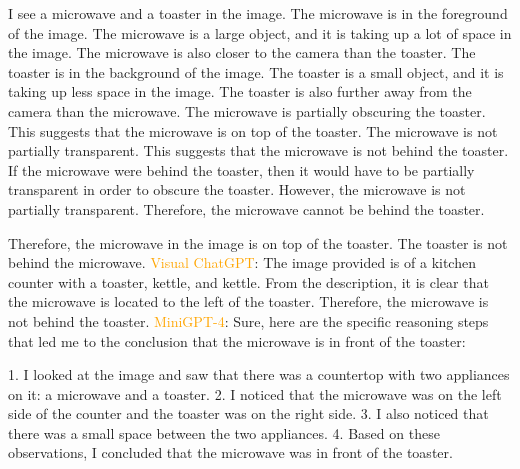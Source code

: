 \begin{enumerate}
    I see a microwave and a toaster in the image.
    The microwave is in the foreground of the image. The microwave is a large object, and it is taking up a lot of space in the image. The microwave is also closer to the camera than the toaster.
    The toaster is in the background of the image. The toaster is a small object, and it is taking up less space in the image. The toaster is also further away from the camera than the microwave.
    The microwave is partially obscuring the toaster. This suggests that the microwave is on top of the toaster.
    The microwave is not partially transparent. This suggests that the microwave is not behind the toaster.
    If the microwave were behind the toaster, then it would have to be partially transparent in order to obscure the toaster. However, the microwave is not partially transparent. Therefore, the microwave cannot be behind the toaster.

    Therefore, the microwave in the image is on top of the toaster. The toaster is not behind the microwave.
    \subitem \textcolor{orange}{Visual ChatGPT}: 
    The image provided is of a kitchen counter with a toaster, kettle, and kettle. From the description, it is clear that the microwave is located to the left of the toaster. Therefore, the microwave is not behind the toaster.
    \subitem \textcolor{orange}{MiniGPT-4}: Sure, here are the specific reasoning steps that led me to the conclusion that the microwave is in front of the toaster:

    1. I looked at the image and saw that there was a countertop with two appliances on it: a microwave and a toaster.
    2. I noticed that the microwave was on the left side of the counter and the toaster was on the right side.
    3. I also noticed that there was a small space between the two appliances.
    4. Based on these observations, I concluded that the microwave was in front of the toaster.
\end{enumerate}
